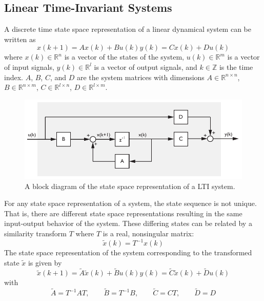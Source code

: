 \subsection{Linear Time-Invariant Systems}\label{sec:linear_time_invariant_systems}
A discrete time state space representation of a linear dynamical system can be written as
\begin{subequations}\label{eq:2_lti_state_space}
\begin{equation}x(k+1) = Ax(k) + Bu(k)\end{equation}
\begin{equation}y(k) = Cx(k) + Du(k)\end{equation}
\end{subequations}
where $x(k) \in \mathbb{R}^n$ is a vector of the states of the system, $u(k) \in \mathbb{R}^m$ is a vector of input signals, $y(k) \in \mathbb{R}^l$ is a vector of output signals, and  $k \in \mathbb{Z}$ is the time index. $A$, $B$, $C$, and $D$ are the system matrices with dimensions $A\in\mathbb{R}^{n\times n}$, $B\in\mathbb{R}^{n\times m}$, $C\in\mathbb{R}^{l\times n}$, $D\in\mathbb{R}^{l\times m}$.
\begin{figure}[htb!]
	\centering
	\includegraphics{../fig/lti_block_diagram.pdf}
	\caption{A block diagram of the state space representation of a LTI system.}
\end{figure}

For any state space representation of a system, the state sequence is not unique. That is, there are different state space representations resulting in the same input-output behavior of the system. These differing states can be related by a similarity transform $T$ where $T$ is a real, nonsingular matrix:
\begin{equation*}
\tilde{x}(k) = T^{-1}x(k)
\end{equation*}
The state space representation of the system corresponding to the transformed state $\tilde{x}$ is given by
\begin{subequations}
\begin{equation*}\tilde{x}(k+1) = \tilde{A}\tilde{x}(k) + \tilde{B}u(k)\end{equation*}
\begin{equation*}y(k) = \tilde{C}\tilde{x}(k) + \tilde{D}u(k)\end{equation*}
\end{subequations}
with
\begin{equation*}
\tilde{A} = T^{-1}AT, \qquad
\tilde{B} = T^{-1}B, \qquad
\tilde{C} = CT, \qquad
\tilde{D} = D
\end{equation*}


